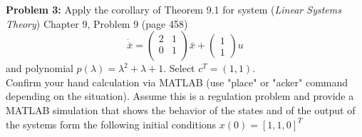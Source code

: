 \documentclass[12pt]{article}
\begin{document}
\noindent
\textbf{Problem 3:} Apply the corollary of Theorem 9.1 for system ({\em Linear Systems Theory}) Chapter 9, Problem 9 (page 458)
$$
\dot{\bar{x}}=
\begin{pmatrix}
	2 & 1 \\
	0 & 1 \\
\end{pmatrix}
\bar{x}+
\begin{pmatrix}
	1 \\
	1
\end{pmatrix} u
$$
and polynomial $p(\lambda)=\lambda^2+\lambda+1$. Select $c^T=(1, 1)$.\\
Confirm your hand calculation via MATLAB (use "place" or "acker" command depending on the situation). Assume this is a regulation problem and provide a MATLAB simulation that shows the behavior of the states and of the output of the systems form the following initial conditions $x(0)=[1,1,0]^T$\\
\end{document}
